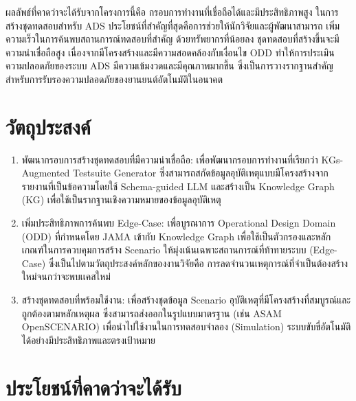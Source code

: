 ผลลัพธ์ที่คาดว่าจะได้รับจากโครงการนี้คือ กรอบการทำงานที่เชื่อถือได้และมีประสิทธิภาพสูง ในการสร้างชุดทดสอบสำหรับ ADS ประโยชน์ที่สำคัญที่สุดคือการช่วยให้นักวิจัยและผู้พัฒนาสามารถ เพิ่มความเร็วในการค้นพบสถานการณ์ทดสอบที่สำคัญ ด้วยทรัพยากรที่น้อยลง ชุดทดสอบที่สร้างขึ้นจะมีความน่าเชื่อถือสูง เนื่องจากมีโครงสร้างและมีความสอดคล้องกับเงื่อนไข ODD ทำให้การประเมินความปลอดภัยของระบบ ADS มีความเข้มงวดและมีคุณภาพมากขึ้น ซึ่งเป็นการวางรากฐานสำคัญสำหรับการรับรองความปลอดภัยของยานยนต์อัตโนมัติในอนาคต

\section{วัตถุประสงค์}\label{sec:objectives}

\begin{enumerate}
    \item พัฒนากรอบการสร้างชุดทดสอบที่มีความน่าเชื่อถือ: เพื่อพัฒนากรอบการทำงานที่เรียกว่า KGs-Augmented Testsuite Generator ซึ่งสามารถสกัดข้อมูลอุบัติเหตุแบบมีโครงสร้างจากรายงานที่เป็นข้อความโดยใช้ Schema-guided LLM และสร้างเป็น Knowledge Graph (KG) เพื่อใช้เป็นรากฐานเชิงความหมายของข้อมูลอุบัติเหตุ
    \item เพิ่มประสิทธิภาพการค้นพบ Edge-Case: เพื่อบูรณาการ Operational Design Domain (ODD) ที่กำหนดโดย JAMA เข้ากับ Knowledge Graph เพื่อใช้เป็นตัวกรองและหลักเกณฑ์ในการควบคุมการสร้าง Scenario ให้มุ่งเน้นเฉพาะสถานการณ์ที่ท้าทายระบบ (Edge-Case) ซึ่งเป็นไปตามวัตถุประสงค์หลักของงานวิจัยคือ การลดจำนวนเหตุการณ์ที่จำเป็นต้องสร้างใหม่จนกว่าจะพบเเคสใหม่
    \item สร้างชุดทดสอบที่พร้อมใช้งาน: เพื่อสร้างชุดข้อมูล Scenario อุบัติเหตุที่มีโครงสร้างที่สมบูรณ์และถูกต้องตามหลักเหตุผล ซึ่งสามารถส่งออกในรูปแบบมาตรฐาน (เช่น ASAM OpenSCENARIO) เพื่อนำไปใช้งานในการทดสอบจำลอง (Simulation) ระบบขับขี่อัตโนมัติได้อย่างมีประสิทธิภาพและตรงเป้าหมาย
\end{enumerate}

\section{ประโยชน์ที่คาดว่าจะได้รับ}\label{sec:expected-benefits}

